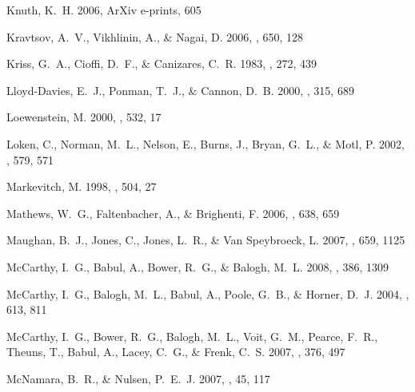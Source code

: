 \documentclass[12pt,preprint]{aastex}
\begin{document}
\begin{thebibliography}{139}
{Knuth}, K.~H. 2006, ArXiv e-prints, 605

{Kravtsov}, A.~V., {Vikhlinin}, A., \& {Nagai}, D. 2006, \apj, 650, 128

{Kriss}, G.~A., {Cioffi}, D.~F., \& {Canizares}, C.~R. 1983, \apj, 272, 439

{Lloyd-Davies}, E.~J., {Ponman}, T.~J., \& {Cannon}, D.~B. 2000, \mnras, 315,
  689

{Loewenstein}, M. 2000, \apj, 532, 17

{Loken}, C., {Norman}, M.~L., {Nelson}, E., {Burns}, J., {Bryan}, G.~L., \&
  {Motl}, P. 2002, \apj, 579, 571

{Markevitch}, M. 1998, \apj, 504, 27

{Mathews}, W.~G., {Faltenbacher}, A., \& {Brighenti}, F. 2006, \apj, 638, 659

{Maughan}, B.~J., {Jones}, C., {Jones}, L.~R., \& {Van Speybroeck}, L. 2007,
  \apj, 659, 1125

{McCarthy}, I.~G., {Babul}, A., {Bower}, R.~G., \& {Balogh}, M.~L. 2008,
  \mnras, 386, 1309

{McCarthy}, I.~G., {Balogh}, M.~L., {Babul}, A., {Poole}, G.~B., \& {Horner},
  D.~J. 2004, \apj, 613, 811

{McCarthy}, I.~G., {Bower}, R.~G., {Balogh}, M.~L., {Voit}, G.~M., {Pearce},
  F.~R., {Theuns}, T., {Babul}, A., {Lacey}, C.~G., \& {Frenk}, C.~S. 2007,
  \mnras, 376, 497

{McNamara}, B.~R., \& {Nulsen}, P.~E.~J. 2007, \araa, 45, 117


\end{thebibliography}
\end{document}
